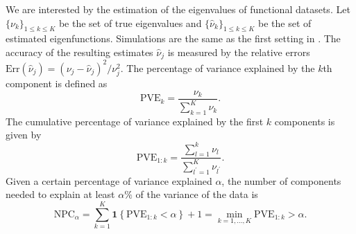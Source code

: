 We are interested by the estimation of the eigenvalues of functional datasets. Let $\{\nu_k\}_{1 \leq k \leq K}$ be the set of true eigenvalues and $\{\widehat{\nu}_k\}_{1 \leq k \leq K}$ be the set of estimated eigenfunctions. Simulations are the same as the first setting in \cite{happMultivariateFunctionalPrincipal2018a}. The accuracy of the resulting estimates $\widehat{\nu}_j$ is measured by the relative errors $\text{Err}(\widehat{\nu}_j)  = (\nu_j - \widehat{\nu}_j)^2 / \nu^2_j$. The percentage of variance explained by the $k$th component is defined as
\begin{equation}\label{eq:pve}
     \text{PVE}_k = \frac{\nu_k}{\sum_{k = 1}^K \nu_k}.
\end{equation}
The cumulative percentage of variance explained by the first $k$ components is given by
\begin{equation}\label{eq:cum_pve}
     \text{PVE}_{1:k} = \frac{\sum_{l = 1}^k \nu_l}{\sum_{l^\prime = 1}^K \nu_{l^\prime}}.
\end{equation}
Given a certain percentage of variance explained $\alpha$, the number of components needed to explain at least $\alpha\%$ of the variance of the data is
\begin{equation}\label{eq:npc}
     \text{NPC}_{\alpha} = \sum_{k = 1}^K \mathbf{1}\left\{\text{PVE}_{1:k} < \alpha\right\} + 1 = \min_{k = 1, \dots, K} \text{PVE}_{1:k} > \alpha.
\end{equation}

